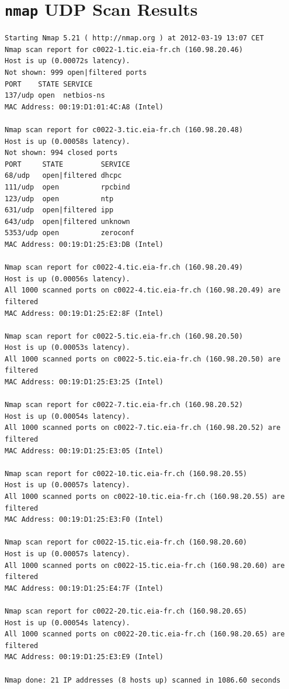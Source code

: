 \documentclass[10pt,a4paper,twoside,onecolumn]{article}
\begin{document}
\clearpage
\section{\texttt{nmap} UDP Scan Results}
\label{sec:udp-scan}

\begin{lstlisting}
Starting Nmap 5.21 ( http://nmap.org ) at 2012-03-19 13:07 CET
Nmap scan report for c0022-1.tic.eia-fr.ch (160.98.20.46)
Host is up (0.00072s latency).
Not shown: 999 open|filtered ports
PORT    STATE SERVICE
137/udp open  netbios-ns
MAC Address: 00:19:D1:01:4C:A8 (Intel)

Nmap scan report for c0022-3.tic.eia-fr.ch (160.98.20.48)
Host is up (0.00058s latency).
Not shown: 994 closed ports
PORT     STATE         SERVICE
68/udp   open|filtered dhcpc
111/udp  open          rpcbind
123/udp  open          ntp
631/udp  open|filtered ipp
643/udp  open|filtered unknown
5353/udp open          zeroconf
MAC Address: 00:19:D1:25:E3:DB (Intel)

Nmap scan report for c0022-4.tic.eia-fr.ch (160.98.20.49)
Host is up (0.00056s latency).
All 1000 scanned ports on c0022-4.tic.eia-fr.ch (160.98.20.49) are filtered
MAC Address: 00:19:D1:25:E2:8F (Intel)

Nmap scan report for c0022-5.tic.eia-fr.ch (160.98.20.50)
Host is up (0.00053s latency).
All 1000 scanned ports on c0022-5.tic.eia-fr.ch (160.98.20.50) are filtered
MAC Address: 00:19:D1:25:E3:25 (Intel)

Nmap scan report for c0022-7.tic.eia-fr.ch (160.98.20.52)
Host is up (0.00054s latency).
All 1000 scanned ports on c0022-7.tic.eia-fr.ch (160.98.20.52) are filtered
MAC Address: 00:19:D1:25:E3:05 (Intel)

Nmap scan report for c0022-10.tic.eia-fr.ch (160.98.20.55)
Host is up (0.00057s latency).
All 1000 scanned ports on c0022-10.tic.eia-fr.ch (160.98.20.55) are filtered
MAC Address: 00:19:D1:25:E3:F0 (Intel)

Nmap scan report for c0022-15.tic.eia-fr.ch (160.98.20.60)
Host is up (0.00057s latency).
All 1000 scanned ports on c0022-15.tic.eia-fr.ch (160.98.20.60) are filtered
MAC Address: 00:19:D1:25:E4:7F (Intel)

Nmap scan report for c0022-20.tic.eia-fr.ch (160.98.20.65)
Host is up (0.00054s latency).
All 1000 scanned ports on c0022-20.tic.eia-fr.ch (160.98.20.65) are filtered
MAC Address: 00:19:D1:25:E3:E9 (Intel)

Nmap done: 21 IP addresses (8 hosts up) scanned in 1086.60 seconds
\end{lstlisting}
\end{document}
